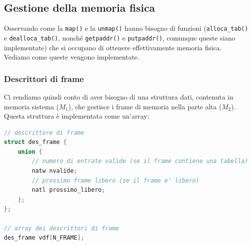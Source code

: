 \documentclass[a4paper,11pt]{article}
\begin{document}
\subsection{Gestione della memoria fisica}
Osservando come la \lstinline|map()| e la \lstinline|unmap()| hanno bisogno di funzioni (\lstinline|alloca_tab()| e \lstinline|dealloca_tab()|, nonché \lstinline|getpaddr()| e \lstinline|putpaddr()|, comunque queste siano implementate) che si occupano di ottenere effettivamente memoria fisica.
Vediamo come queste vengono implementate.

\subsubsection{Descrittori di frame}
Ci rendiamo quindi conto di aver bisogno di una struttura dati, contenuta in memoria sistema ($M_1$), che gestisce i frame di memoria nella parte alta ($M_2$). 
Questa struttura è implementata come un'array:
\begin{lstlisting}[language=C++, style=codestyle]	
// descrittore di frame
struct des_frame {
	union {
		// numero di entrate valide (se il frame contiene una tabella)
		natw nvalide;
		// prossimo frame libero (se il frame e' libero)
		natl prossimo_libero;
	};
};

// array dei descrittori di frame
des_frame vdf[N_FRAME];
\end{lstlisting}
\end{document}
